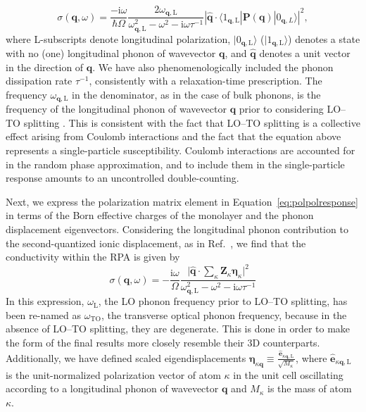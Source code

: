 \documentclass[aps,prb,twocolumn,
	           groupedaddress,superscriptaddress,
               amsfonts,amssymb,amsmath,floatfix,
	           citeautoscript]{revtex4-1}
\newcommand{\iu}{\mathrm{i}}
\begin{document}
\begin{equation}
    \sigma(\mathbf{q},\omega) = \frac{-\iu\omega}{\hbar\Omega} \frac{2\omega_{\mathbf{q},\mathrm{L}}}{\omega^2_{\mathbf{q},\mathrm{L}}-\omega^2-\iu\omega\tau^{-1}}|\hat{\mathbf{q}}\cdot\langle 1_{\mathbf{q},\mathrm{L}}|\mathbf{P}(\mathbf{q})|0_{\mathbf{q},L}\rangle|^2,
    \label{eq:polpolresponse}
\end{equation}
where L-subscripts denote longitudinal polarization, $|0_{\mathbf{q},\mathrm{L}}\rangle$ ($|1_{\mathbf{q},\mathrm{L}}\rangle$) denotes a state with no (one) longitudinal phonon of wavevector $\mathbf{q}$, and $\hat{\mathbf{q}}$ denotes a unit vector in the direction of $\mathbf{q}$. We have also phenomenologically included the phonon dissipation rate $\tau^{-1}$, consistently with  a relaxation-time prescription.  The frequency $\omega_{\mathbf{q},\mathrm{L}}$ in the denominator, as in the case of bulk phonons, is the frequency of the longitudinal phonon of wavevector $\mathbf{q}$ prior to considering LO--TO splitting \cite{BornHuang:1954}.
This is consistent with the fact that LO--TO splitting is a collective effect arising from Coulomb interactions and the fact that the equation above represents a single-particle susceptibility. Coulomb interactions are accounted for in the random phase approximation, and to include them in the single-particle response amounts to an uncontrolled double-counting. 

Next, we express the polarization matrix element in Equation~\eqref{eq:polpolresponse} in terms of the Born effective charges of the monolayer and the phonon displacement eigenvectors. Considering the longitudinal phonon contribution to the second-quantized ionic displacement, as in Ref.~, we find that the conductivity within the RPA is given by
\begin{equation}
    \sigma(\mathbf{q},\omega) = -\frac{\iu\omega }{\Omega}\frac{\Big|\hat{\mathbf{q}}\cdot\sum\limits_{\kappa}\mathbf{Z}_{\kappa}\boldsymbol{\eta}_{\kappa} \Big|^2}{\omega^2_{\mathbf{q},\mathrm{L}}-\omega^2-\iu\omega\tau^{-1}}
    \label{eq:conductivity_simplified}
\end{equation}
  In this expression, $\omega_\mathrm{L}$, the LO phonon frequency prior to LO--TO splitting, has been re-named as $\omega_{\mathrm{TO}}$, the transverse optical phonon frequency, because in the absence of LO--TO splitting, they are degenerate. This is done in order to make the form of the final results more closely resemble their 3D counterparts. 
Additionally, we have defined scaled eigendisplacements $\boldsymbol{\eta}_{\kappa\mathbf{q}}\equiv \frac{\hat{\mathbf{e}}_{\kappa\mathbf{q},\mathrm{L}}}{\sqrt{M_{\kappa}}}$, where $\hat{\mathbf{e}}_{\kappa\mathbf{q},\mathrm{L}}$ is the unit-normalized polarization vector of atom $\kappa$ in the unit cell oscillating according to a longitudinal phonon of wavevector $\mathbf{q}$ and $M_{\kappa}$ is the mass of atom $\kappa$. 
\end{document}
